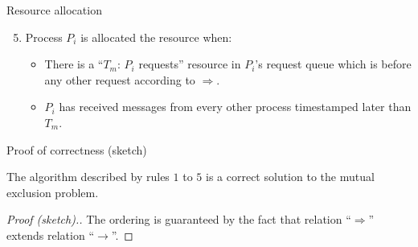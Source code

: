 \documentclass[12pt]{beamer}
\begin{document}
    \begin{frame}{Resource allocation}
        \begin{enumerate}
            \setcounter{enumi}{4}
            \item Process \(P_i\) is allocated the resource when:
            \begin{itemize}
                \item There is a ``\(T_m\): \(P_i\) requests'' resource in \(P_i\)'s request
                queue which is before any other request according to \(\Rightarrow\).
                \item \(P_i\) has received messages from every other process timestamped
                later than \(T_m\).
            \end{itemize}
        \end{enumerate}
    \end{frame}

    \begin{frame}{Proof of correctness (sketch)}
        \begin{theorem}
            The algorithm described by rules \(1\) to \(5\) is a correct solution to the
            mutual exclusion problem.
        \end{theorem}
        \begin{proof}[Proof (sketch).]
            The ordering is guaranteed by the fact that relation ``\(\Rightarrow\)''
            extends relation ``\(\rightarrow\)''.
        \end{proof}
    \end{frame}
\end{document}
